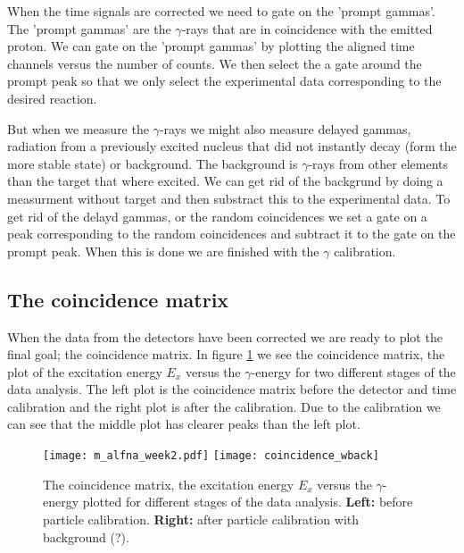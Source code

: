 \documentclass[11pt,a4wide]{article}
\begin{document}
When the time signals are corrected we need to gate on the 'prompt gammas'. The 'prompt gammas' are the $\gamma$-rays that are in coincidence with the emitted proton. We can gate on the 'prompt gammas' by plotting the aligned time channels versus the number of counts. We then select the a  gate around the prompt peak so that we only select the experimental data corresponding to the desired reaction. 

But when we measure the $\gamma$-rays we might also measure delayed gammas, radiation from a previously excited nucleus that did not instantly decay (form the more stable state) or background. The background is $\gamma$-rays from other elements than the target that where excited. We can get rid of the backgrund by doing a measurment without target and then substract this to the experimental data. To get rid of the delayd gammas, or the random coincidences we set a gate on a peak corresponding to the random coincidences and subtract it to the gate on the prompt peak. When this is done we are finished with the $\gamma$ calibration.


\subsection{ The coincidence matrix}
When the data from the detectors have been corrected we are ready to plot the final goal; the coincidence matrix. In figure \ref{fig: coincidence} we see the coincidence matrix, the plot of the excitation energy $E_x$ versus the $\gamma$-energy for two different stages of the data analysis. The left plot is the coincidence matrix before the detector and time calibration and the right plot is after the calibration. Due to the calibration we can see that the middle plot has clearer peaks than the left plot. 

\begin{figure}[htp]
\centering
\texttt{[image: m\_alfna\_week2.pdf]}
\texttt{[image: coincidence\_wback]}
\caption{The coincidence matrix, the excitation energy $E_x$ versus the $\gamma$-energy plotted for different stages of the data analysis. \textbf{Left:} before particle calibration. \textbf{Right:} after particle calibration with background (?). }%
\label{fig: coincidence}
\end{figure}
\end{document}
